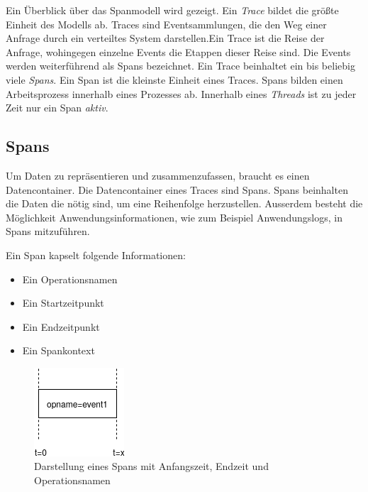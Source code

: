 Ein Überblick über das Spanmodell wird gezeigt. Ein \emph{Trace} bildet die größte Einheit des Modells ab. Traces sind Eventsammlungen, die den Weg einer Anfrage durch ein verteiltes System darstellen.Ein Trace ist die Reise der Anfrage, wohingegen einzelne Events die Etappen dieser Reise sind. Die Events werden weiterführend als Spans bezeichnet.  Ein Trace beinhaltet ein bis beliebig viele \emph{Spans}. Ein Span ist die kleinste Einheit eines Traces. Spans bilden einen Arbeitsprozess innerhalb eines Prozesses ab. Innerhalb eines \emph{Threads} ist zu jeder Zeit nur ein Span \emph{aktiv}.


\subsection{Spans}
\label{subsection:Spans}
Um Daten zu repräsentieren und zusammenzufassen, braucht es einen Datencontainer. Die Datencontainer eines Traces sind Spans. Spans beinhalten die Daten die nötig sind, um eine Reihenfolge herzustellen. Ausserdem besteht die Möglichkeit Anwendungsinformationen, wie zum Beispiel Anwendungslogs, in Spans mitzuführen.

Ein Span kapselt folgende Informationen:
\begin{itemize}
	\item Ein Operationsnamen
	\item Ein Startzeitpunkt
	\item Ein Endzeitpunkt
	\item Ein Spankontext
\end{itemize}

\begin{figure}[!ht]
	\centering
	\includegraphics[scale=0.7]{img/Design/Span.png}
	\caption[Zeitliche Darstellung eines Spans]{Darstellung eines Spans mit Anfangszeit, Endzeit und Operationsnamen}
	\label{fig:Span}
\end{figure}

